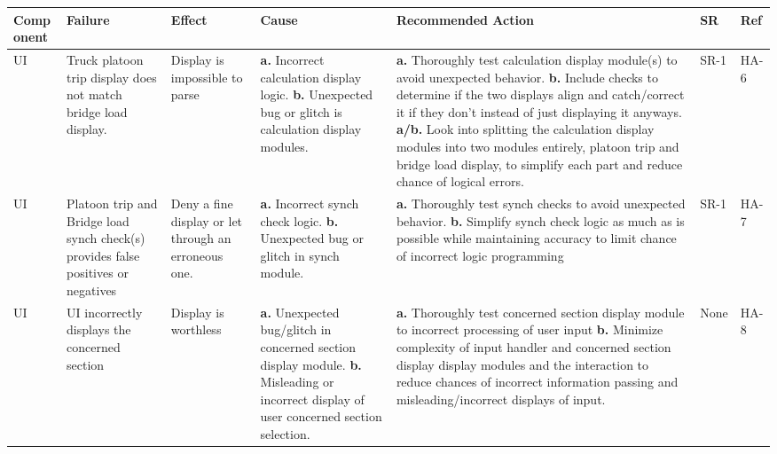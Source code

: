 \documentclass{article}
\begin{document}
\begin{landscape}
\begin{table}[H]
\begin{tabular}{|p{} | p{} | p{} | p{} | p{} | p{} | p{}|}
      \toprule
      \textbf{Comp onent} & \textbf{Failure} & \textbf{Effect} & \textbf{Cause} & \textbf{Recommended Action} & \textbf{SR} & \textbf{Ref}\\
  \midrule
    UI&Truck platoon trip display does not match bridge load display.
    &Display is impossible to parse&\textbf{a.} Incorrect calculation display logic.\newline
    \textbf{b.} Unexpected bug or glitch is calculation display modules.
&\textbf{a.} Thoroughly test calculation display module(s) to avoid unexpected behavior.\newline
\textbf{b.} Include checks to determine if the two displays align and catch/correct it if they don’t instead of just displaying it anyways.\newline
\textbf{a/b.} Look into splitting the calculation display modules into two modules entirely, platoon trip and bridge load display, to simplify each part and 
reduce chance of logical errors.
&SR-1&HA-6\\
  \midrule
      UI & Platoon trip and Bridge load synch check(s) provides false positives or negatives &  Deny a fine display or let through an erroneous one.
    & \textbf{a.} Incorrect synch check logic.\newline
      \textbf{b.} Unexpected bug or glitch in synch module.
    & \textbf{a.} Thoroughly test synch checks to avoid unexpected behavior.\newline
      \textbf{b.} Simplify synch check logic as much as is possible while maintaining accuracy to limit chance of incorrect logic programming
    &SR-1&HA-7\\
  \midrule
      UI&UI incorrectly displays the concerned section&Display is worthless& \textbf{a.} Unexpected bug/glitch in concerned section display module.\newline
      \textbf{b.} Misleading or incorrect display of user concerned section selection.
    & \textbf{a.} Thoroughly test concerned section display module to incorrect processing of user input\newline
      \textbf{b.} Minimize complexity of input handler and concerned section display display modules and the interaction to reduce chances of 
      incorrect information passing and misleading/incorrect displays of input.
      &None&HA-8\\
  \bottomrule
    \end{tabular}
    \end{table}
    \pagebreak
    \begin{table}[H]

\end{table}
\end{landscape}
\end{document}
